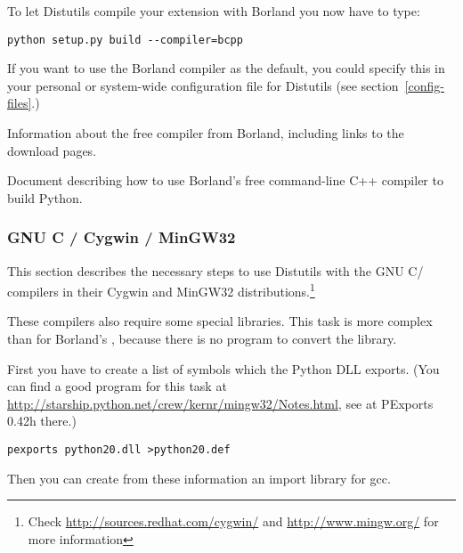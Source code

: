 \documentclass{howto}
\begin{document}
To let Distutils compile your extension with Borland \Cpp{} you now have
to type:

\begin{verbatim}
python setup.py build --compiler=bcpp
\end{verbatim}

If you want to use the Borland \Cpp{} compiler as the default, you
could specify this in your personal or system-wide configuration file
for Distutils (see section~\ref{config-files}.)
 
\begin{seealso}
    {Information about the free \Cpp{} compiler from Borland,
     including links to the download pages.}

    {Document describing how to use Borland's free command-line C++
     compiler to build Python.}
\end{seealso}


\subsubsection{GNU C / Cygwin / MinGW32}

This section describes the necessary steps to use Distutils with the
GNU C/\Cpp{} compilers in their Cygwin and MinGW32
distributions.\footnote{Check
\url{http://sources.redhat.com/cygwin/} and
\url{http://www.mingw.org/} for more information}


These compilers also require some special libraries.
This task is more complex than for Borland's \Cpp, because there is no
program to convert the library.
 
First you have to create a list of symbols which the Python DLL exports.
(You can find a good program for this task at 
\url{http://starship.python.net/crew/kernr/mingw32/Notes.html}, see at 
PExports 0.42h there.)

\begin{verbatim}
pexports python20.dll >python20.def
\end{verbatim}

Then you can create from these information an import library for gcc.
 
\end{document}
